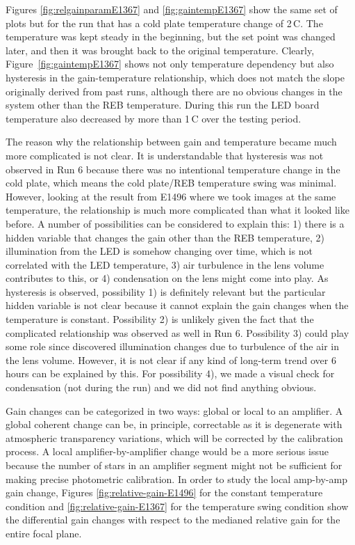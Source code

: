 Figures \ref{fig:relgainparamE1367} and \ref{fig:gaintempE1367} show the same set of plots but for the run that has a cold plate temperature change of 2\,C.
The temperature was kept steady in the beginning, but the set point was changed later, and then it was brought back to the original temperature. 
Clearly, Figure~\ref{fig:gaintempE1367} shows not only temperature dependency but also hysteresis in the gain-temperature relationship, which does not match the slope originally derived from past runs, although there are no obvious changes in the system other than the REB temperature.
During this run the LED board temperature also decreased by more than 1\,C over the testing period.


The reason why the relationship between gain and temperature became much more complicated is not clear. It is understandable that hysteresis was not observed in Run 6 because there was no intentional temperature change in the cold plate, which means the cold plate/REB temperature swing was minimal. However, looking at the result from E1496 where we took images at the same temperature, the relationship is much more complicated than what it looked like before. A number of possibilities can be considered to explain this: 1) there is a hidden variable that changes the gain other than the REB temperature, 2) illumination from the LED is somehow changing over time, which is not correlated with the LED temperature, 3) air turbulence in the lens volume contributes to this, or 4) condensation on the lens might come into play. As hysteresis is observed, possibility 1) is definitely relevant but the particular hidden variable is not clear because it cannot explain the gain changes when the temperature is constant. Possibility 2) is unlikely given the fact that the complicated relationship was observed as well in Run 6. Possibility 3) could play some role since \citet{2024arXiv241113386B} discovered illumination changes due to turbulence of the air in the lens volume. However, it is not clear if any kind of long-term trend over 6 hours can be explained by this. For possibility 4), we made a visual check for condensation (not during the run) and we did not find anything obvious. 

Gain changes can be categorized in two ways: global or local to an amplifier.  A global coherent change can be, in principle, correctable as it is degenerate with atmospheric transparency variations, which will be corrected by the calibration process. A local amplifier-by-amplifier change would be a more serious issue because the number of stars in an amplifier segment might not be sufficient for making precise photometric calibration. In order to study the local amp-by-amp gain change, Figures \ref{fig:relative-gain-E1496} for the constant temperature condition and \ref{fig:relative-gain-E1367} for the temperature swing condition show the differential gain changes with respect to the medianed relative gain for the entire focal plane. %

